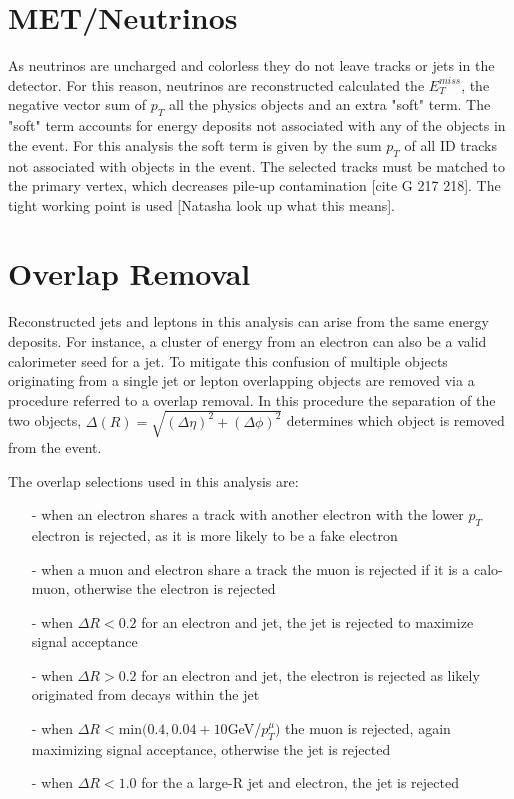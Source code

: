 \section{MET/Neutrinos}
As neutrinos are uncharged and colorless they do not leave tracks or jets in the detector. For this reason, neutrinos are reconstructed calculated the $E_{T}^{miss}$, the negative vector sum of $p_{T}$ all the physics objects and an extra "soft" term. The "soft" term accounts for energy deposits not associated with any of the objects in the event. For this analysis the soft term is given by the sum $p_{T}$ of all ID tracks not associated with objects in the event. The selected tracks must be matched to the primary vertex, which decreases pile-up contamination [cite G 217 218]. The tight working point is used [Natasha look up what this means].  

\section{Overlap Removal}
Reconstructed jets and leptons in this analysis can arise from the same energy deposits. For instance, a cluster of energy from an electron can also be a valid calorimeter seed for a jet. To mitigate this confusion of multiple objects originating from a single jet or lepton overlapping objects are removed via a procedure referred to a overlap removal. In this procedure the separation of the two objects, $\Delta (R) = \sqrt{(\Delta \eta)^{2}+(\Delta \phi)^{2}}$ determines which object is removed from the event. 

The overlap selections used in this analysis are:

\begin{itemize}
\item[-] when an electron shares a track with another electron with the lower $p_{T}$ electron is rejected, as it is more likely to be a fake electron
\item[-] when a muon and electron share a track the muon is rejected if it is a calo-muon, otherwise the electron is rejected
\item[-] when $\Delta R < 0.2$ for an electron and jet, the jet is rejected to maximize signal acceptance
\item[-] when $\Delta R > 0.2$ for an electron and jet, the electron is rejected as likely originated from decays within the jet
\item[-] when $\Delta R <$min$(0.4, 0.04+10$GeV/$p_{T}^{\mu})$ the muon is rejected, again maximizing signal acceptance, otherwise the jet is rejected
\item[-] when $\Delta R < 1.0$ for the a large-R jet and electron, the jet is rejected

\end{itemize}

